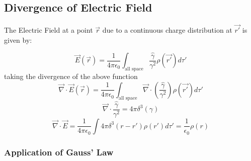 \documentclass{article}
\begin{document}
\subsection{Divergence of Electric Field}

The Electric Field at a point $\vec{r}$ due to a continuous charge distribution at $\vec{r'}$ is given by:

\[\vec{E}(\vec{r}) = \frac{1}{4 \pi \epsilon_0} \int_{\text{all space}} \frac{\hat{\gamma}}{\gamma^2} \rho(\vec{r'}) d\tau' \]
taking the divergence of the above function
\[ \vec{\nabla} \cdot \vec{E}(\vec{r}) = \frac{1}{4 \pi \epsilon_0} \int_{\text{all space}} \vec{\nabla} \cdot \left(\frac{\hat{\gamma}}{\gamma^2}\right) \rho(\vec{r'}) d\tau' \]
\[\vec{\nabla}\cdot\frac{\hat{\gamma}}{\gamma^2} = 4 \pi \delta^3(\gamma)\]
\[ \vec{\nabla} \cdot \vec{E} = \frac{1}{4 \pi \epsilon_0} \int 4 \pi \delta^3(r-r') \rho(r') d\tau' = \frac{1}{\epsilon_0} \rho(r)\]

\subsubsection{Application of Gauss' Law}
\end{document}
